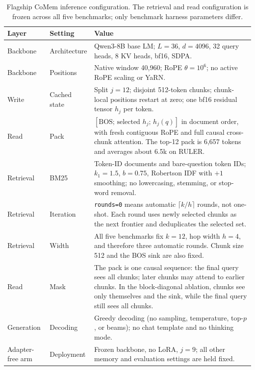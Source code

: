 \begin{table}[t]
\centering
\scriptsize
\renewcommand{\arraystretch}{0.92}
\setlength{\tabcolsep}{3pt}
\begin{tabular}{@{}p{}p{}p{}@{}}
\toprule
\textbf{Layer} & \textbf{Setting} & \textbf{Value} \\
\midrule
Backbone & Architecture & Qwen3-8B base LM; $L{=}36$, $d{=}4096$, 32 query heads, 8 KV heads, bf16, SDPA. \\
Backbone & Positions & Native window 40,960; RoPE $\theta{=}10^6$; no active RoPE scaling or YaRN. \\
Write & Cached state & Split $j{=}12$; disjoint 512-token chunks; chunk-local positions restart at zero; one bf16 residual tensor $h_j$ per token. \\
Read & Pack & $[\mathrm{BOS};\,\text{selected }h_j;\,h_j(q)]$ in document order, with fresh contiguous RoPE and full causal cross-chunk attention. The top-12 pack is 6,657 tokens and averages about 6.5k on RULER. \\
Retrieval & BM25 & Token-ID documents and bare-question token IDs; $k_1{=}1.5$, $b{=}0.75$, Robertson IDF with $+1$ smoothing; no lowercasing, stemming, or stop-word removal. \\
Retrieval & Iteration & \texttt{rounds=0} means automatic $\lceil k/h\rceil$ rounds, not one-shot. Each round uses newly selected chunks as the next frontier and deduplicates the selected set. \\
Retrieval & Width & All five benchmarks fix $k{=}12$, hop width $h{=}4$, and therefore three automatic rounds. Chunk size 512 and the BOS sink are also fixed. \\
Read & Mask & The pack is one causal sequence: the final query sees all chunks; later chunks may attend to earlier chunks. In the block-diagonal ablation, chunks see only themselves and the sink, while the final query still sees all chunks. \\
Generation & Decoding & Greedy decoding (no sampling, temperature, top-$p$, or beams); no chat template and no thinking mode. \\
Adapter-free arm & Deployment & Frozen backbone, no LoRA, $j{=}9$; all other memory and evaluation settings are held fixed. \\
\bottomrule
\end{tabular}
\caption{Flagship CoMem inference configuration. The retrieval and read
configuration is frozen across all five benchmarks; only benchmark harness
parameters differ.}
\label{tab:repro-config}


\end{table}
